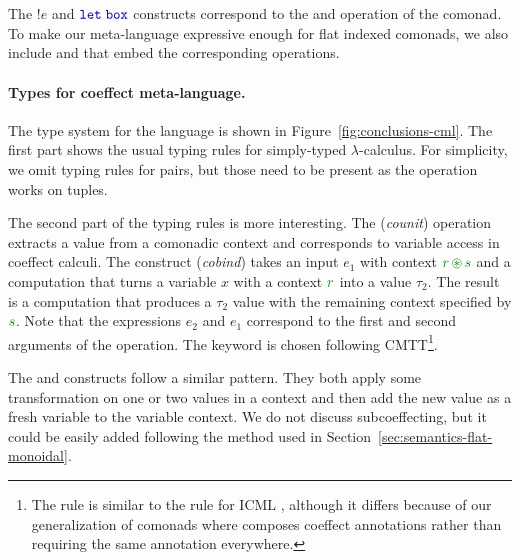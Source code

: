 ~

~

The $!e$ and $\kvd{let\;box}$ constructs correspond to the  and 
operation of the comonad. To make our meta-language expressive enough for flat indexed comonads,
we also include  and  that embed the corresponding operations.

\paragraph{Types for coeffect meta-language.}
The type system for the language is shown in Figure~\ref{fig:conclusions-cml}. The first part
shows the usual typing rules for simply-typed $\lambda$-calculus. For simplicity, we omit typing
rules for pairs, but those need to be present as the  operation works on tuples.

The second part of the typing rules is more interesting. The (\emph{counit}) operation extracts
a value from a comonadic context and corresponds to variable access in coeffect calculi. The
 construct (\emph{cobind}) takes an input $e_1$ with context $\cclrd{r}\,\cseq\,\cclrd{s}$
and a computation that turns a variable $x$ with a context $\cclrd{r}$ into a value $\tau_2$.
The result is a computation that produces a $\tau_2$ value with the remaining context specified
by $\cclrd{s}$. Note that the expressions $e_2$ and $e_1$ correspond to the first and second
arguments of the  operation. The keyword  is chosen following
CMTT\footnote{The rule is similar to the  rule for ICML \cite[p. 14]{logic-cmtt},
although it differs because of our generalization of comonads where  composes
coeffect annotations rather than requiring the same annotation everywhere.}.

The  and  constructs follow a similar pattern. They both apply some
transformation on one or two values in a context and then add the new value as a fresh variable
to the variable context. We do not discuss subcoeffecting, but it could be easily added following
the method used in Section~\ref{sec:semantics-flat-monoidal}.


